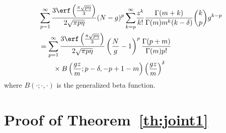 {\begin{align}
    \begin{split}
        &\sum\limits_{p=1}^\infty  \frac{3\erf\left(\tfrac{\pi \sqrt{p \eta}}{3}\right)}{2 \sqrt{\pi p \eta}} (N-g)^p \sum\limits_{k=p}^\infty \!\frac{z^k}{k!} \frac{\Gamma(m+k) }{\Gamma(m) m^k (k-\delta)} \binom{k}{p} g^{k-p}\\
        &= \sum\limits_{p=1}^\infty  \frac{3\erf\left(\tfrac{\pi \sqrt{p \eta}}{3}\right)}{2 \sqrt{\pi p \eta}} \left(\frac{N}{g}-1\right)^p \frac{\Gamma(p+m)}{\Gamma(m)p!}\\
        &\qquad \times B\left(\frac{gz}{m};p-\delta,-p+1-m\right)\left(\frac{gz}{m}\right)^\delta
    \end{split}
\end{align}
where $B(\cdot;\cdot,\cdot)$ is the generalized beta function.


\section{Proof of Theorem~\ref{th:joint1}}
\label{sec:proofjoint1}
}
